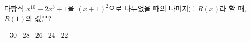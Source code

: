 다항식 $x^{10}-2x^3+1$을 $(x+1)^2$으로 나누었을 때의 나머지를 $R(x)$라 할 때, $R(1)$의 값은?
\begin{choices32}{$-30$}{$-28$}{$-26$}{$-24$}{$-22$}\end{choices32}
